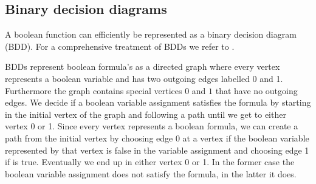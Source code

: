 \subsection{Binary decision diagrams}
\label{sec_prelim_bdd}
A boolean function can efficiently be represented as a binary decision diagram (BDD). For a comprehensive treatment of BDDs we refer to \cite{BDD_book,Handbook_BDD_Chapter}.

BDDs represent boolean formula's as a directed graph where every vertex represents a boolean variable and has two outgoing edges labelled 0 and 1. Furthermore the graph contains special vertices $0$ and $1$ that have no outgoing edges. We decide if a boolean variable assignment satisfies the formula by starting in the initial vertex of the graph and following a path until we get to either vertex 0 or 1. Since every vertex represents a boolean formula, we can create a path from the initial vertex by choosing edge 0 at a vertex if the boolean variable represented by that vertex is false in the variable assignment and choosing edge 1 if is true. Eventually we end up in either vertex 0 or 1. In the former case the boolean variable assignment does not satisfy the formula, in the latter it does.

